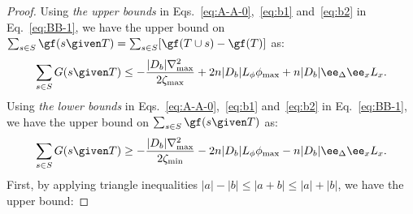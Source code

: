 \begin{proof}
 Using \emph{the upper bounds} in Eqs.~\eqref{eq:A-A-0},~\eqref{eq:b1} and~\eqref{eq:b2} in Eq.~\eqref{eq:BB-1}, we have the upper bound on $\sum_{s\in S} \gf(s\given T) = \sum_{s \in S} [\gf (T\cup s) - \gf(T)]$ as:
 \begin{align}
 \sum_{s\in S} G(s\given     T) \le  -\frac{|D_b|\nabla_{\max} ^2}{2\zeta_{\max}}+2n|D_b| L_\phi \phi_{\max} + n|D_b| \ee_{\Delta} \ee_x L_x. 
 \end{align}
 Using \emph{the lower bounds} in Eqs.~\eqref{eq:A-A-0},~\eqref{eq:b1} and~\eqref{eq:b2} in Eq.~\eqref{eq:BB-1}, we have the upper bound on $\sum_{s\in S} \gf(s\given T)$ as:
\begin{align} 
\sum_{s\in S} G(s\given     T) \ge  -\frac{|D_b|\nabla_{\max} ^2}{2\zeta_{\min}}-2n|D_b| L_\phi \phi_{\max} - n|D_b| \ee_{\Delta} \ee_x L_x .
\end{align}
First, by applying triangle inequalities $|a|-|b|\le |a+b| \le |a|+|b|$, we have the upper bound:

\end{proof}
